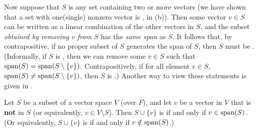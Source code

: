 Now suppose that \(S\) is any \LDP{} set containing two or more vectors
(we have shown that a set with one(single) nonzero vector is \LID{}, in (b)).
Then some vector \(v \in S\) can be written as a linear combination of the other vectors in \(S\), and the subset \emph{obtained by removing \(v\) from \(S\)} has the \emph{same span} as \(S\).
It follows that, by contrapositive, if no proper subset of \(S\) generates the span of \(S\), then \(S\) must be \LID{}.
(Informally, if \(S\) is \LDP{}, then we can remove some \(v \in S\) such that \(\operatorname{span}(S) = \operatorname{span}(S \setminus \{ v \})\).
Contrapositively, if for all element \(v \in S\), \(\operatorname{span}(S) \ne \operatorname{span}(S \setminus \{ v \})\), then \(S\) is \LID{}.)
Another way to view these statements is given in .

\begin{theorem} \label{thm 1.7}
Let \(S\) be a \LID{} subset of a vector space \(V\) (over \(F\)), and let \(v\) be a vector in \(V\) that is \textbf{not} in \(S\) (or equivalently, \(v \in V \setminus S\)).
Then \(S \cup \{v\}\) is \LDP{} if and only if \(v \in \operatorname{span}(S)\).
(Or equivalently, \(S \cup \{v\}\) is \LID{}{} if and only if \(v \notin \operatorname{span}(S)\).)
\end{theorem}

